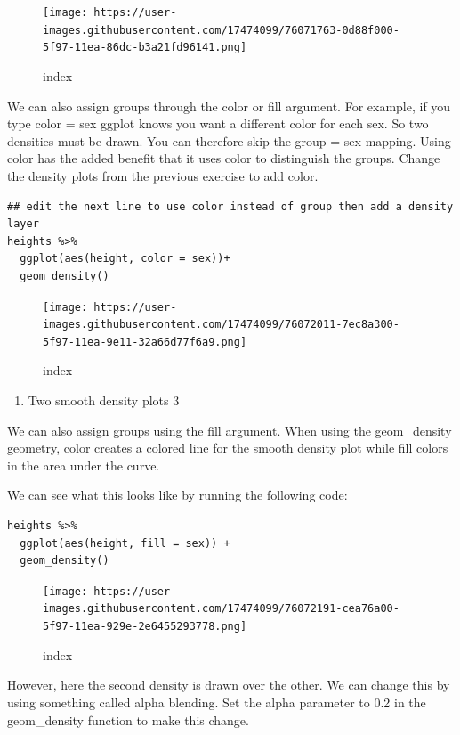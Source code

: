 \documentclass[
]{article}
\providecommand{\tightlist}{%
  \setlength{\itemsep}{0pt}\setlength{\parskip}{0pt}}
\begin{document}
\begin{figure}
\centering
\texttt{[image: https://user-images.githubusercontent.com/17474099/76071763-0d88f000-5f97-11ea-86dc-b3a21fd96141.png]}
\caption{index}
\end{figure}

We can also assign groups through the color or fill argument. For
example, if you type color = sex ggplot knows you want a different color
for each sex. So two densities must be drawn. You can therefore skip the
group = sex mapping. Using color has the added benefit that it uses
color to distinguish the groups. Change the density plots from the
previous exercise to add color.

\begin{verbatim}
## edit the next line to use color instead of group then add a density layer
heights %>% 
  ggplot(aes(height, color = sex))+
  geom_density()
\end{verbatim}

\begin{figure}
\centering
\texttt{[image: https://user-images.githubusercontent.com/17474099/76072011-7ec8a300-5f97-11ea-9e11-32a66d77f6a9.png]}
\caption{index}
\end{figure}

\begin{enumerate}
\def\labelenumi{\arabic{enumi}.}
\setcounter{enumi}{21}
\tightlist
\item
  Two smooth density plots 3
\end{enumerate}

We can also assign groups using the fill argument. When using the
geom\_density geometry, color creates a colored line for the smooth
density plot while fill colors in the area under the curve.

We can see what this looks like by running the following code:

\begin{verbatim}
heights %>% 
  ggplot(aes(height, fill = sex)) + 
  geom_density() 
\end{verbatim}

\begin{figure}
\centering
\texttt{[image: https://user-images.githubusercontent.com/17474099/76072191-cea76a00-5f97-11ea-929e-2e6455293778.png]}
\caption{index}
\end{figure}

However, here the second density is drawn over the other. We can change
this by using something called alpha blending. Set the alpha parameter
to 0.2 in the geom\_density function to make this change.
\end{document}
